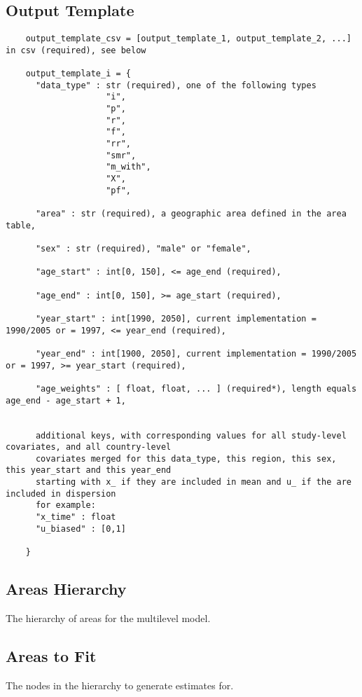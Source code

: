 \subsection{Output Template}
\begin{verbatim}
    output_template_csv = [output_template_1, output_template_2, ...] in csv (required), see below

    output_template_i = {
      "data_type" : str (required), one of the following types
                    "i",
                    "p",
                    "r",
                    "f",
                    "rr",
                    "smr",
                    "m_with",
                    "X",
                    "pf", 

      "area" : str (required), a geographic area defined in the area table,

      "sex" : str (required), "male" or "female",

      "age_start" : int[0, 150], <= age_end (required),

      "age_end" : int[0, 150], >= age_start (required),

      "year_start" : int[1990, 2050], current implementation = 1990/2005 or = 1997, <= year_end (required),

      "year_end" : int[1900, 2050], current implementation = 1990/2005 or = 1997, >= year_start (required),

      "age_weights" : [ float, float, ... ] (required*), length equals age_end - age_start + 1,


      additional keys, with corresponding values for all study-level covariates, and all country-level   
      covariates merged for this data_type, this region, this sex, this year_start and this year_end
      starting with x_ if they are included in mean and u_ if the are included in dispersion
      for example:
      "x_time" : float
      "u_biased" : [0,1]

    }
\end{verbatim}

\subsection{Areas Hierarchy}
The hierarchy of areas for the multilevel model.

\subsection{Areas to Fit}
The nodes in the hierarchy to generate estimates for.
